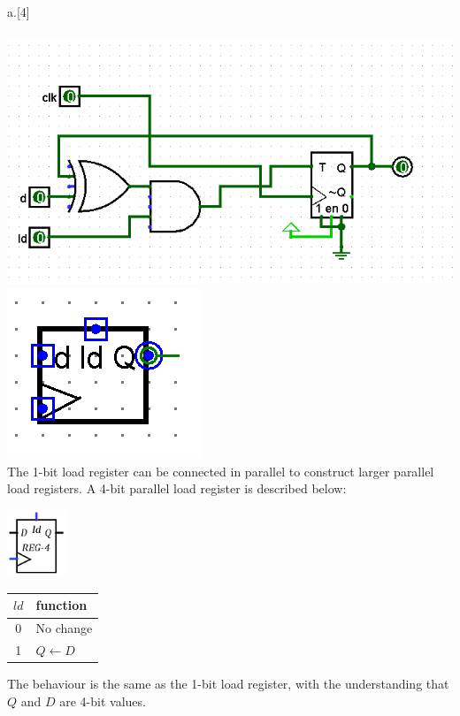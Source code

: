 \begin{question}{a.}[4]
\\
\\\includegraphics{q6-2-1.PNG}
\\\includegraphics{q6-2-2.PNG}
\\

The 1-bit load register can be connected in parallel to construct larger parallel load registers. A 4-bit parallel load register is described below:

\includegraphics[height=2.0cm]{images/reg-4.png}

\begin{tabular}{c | l}
$ld$ & function \\
\hline
0 & No change \\
1 & $Q \leftarrow D$ \\
\end{tabular}

The behaviour is the same as the 1-bit load register, with the understanding that $Q$ and $D$ are 4-bit values.


\end{question}
